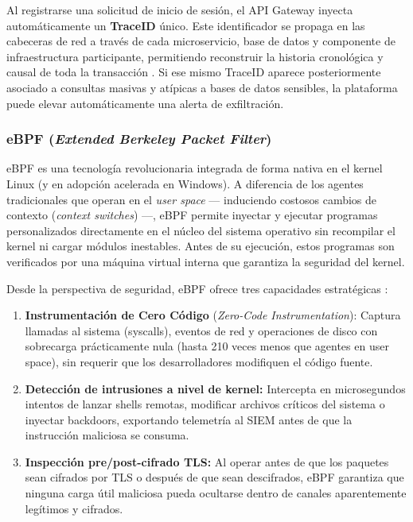 \documentclass[12pt, a4paper]{article}
\begin{document}
Al registrarse una solicitud de inicio de sesión, el API Gateway inyecta
automáticamente un \textbf{TraceID} único. Este identificador se propaga en las
cabeceras de red a través de cada microservicio, base de datos y componente de
infraestructura participante, permitiendo reconstruir la historia cronológica
y causal de toda la transacción \cite{opentelemetry,horovits2025}. Si ese mismo
TraceID aparece posteriormente asociado a consultas masivas y atípicas a bases
de datos sensibles, la plataforma puede elevar automáticamente una alerta de
exfiltración.

\subsubsection{eBPF (\textit{Extended Berkeley Packet Filter})}

eBPF \cite{linuxfoundation2025} es una tecnología revolucionaria integrada de
forma nativa en el kernel Linux (y en adopción acelerada en Windows). A diferencia
de los agentes tradicionales que operan en el \textit{user space} --- induciendo
costosos cambios de contexto (\textit{context switches}) ---, eBPF permite
inyectar y ejecutar programas personalizados directamente en el núcleo del
sistema operativo sin recompilar el kernel ni cargar módulos inestables. Antes
de su ejecución, estos programas son verificados por una máquina virtual interna
que garantiza la seguridad del kernel.

Desde la perspectiva de seguridad, eBPF ofrece tres capacidades estratégicas
\cite{researchgate2024,groundcover2025}:

\begin{enumerate}[noitemsep]
  \item \textbf{Instrumentación de Cero Código} (\textit{Zero-Code Instrumentation}):
        Captura llamadas al sistema (syscalls), eventos de red y operaciones de
        disco con sobrecarga prácticamente nula (hasta 210 veces menos que
        agentes en user space), sin requerir que los desarrolladores modifiquen
        el código fuente.
  \item \textbf{Detección de intrusiones a nivel de kernel:} Intercepta
        en microsegundos intentos de lanzar shells remotas, modificar archivos
        críticos del sistema o inyectar backdoors, exportando telemetría al SIEM
        antes de que la instrucción maliciosa se consuma.
  \item \textbf{Inspección pre/post-cifrado TLS:} Al operar antes de que los
        paquetes sean cifrados por TLS o después de que sean descifrados,
        eBPF garantiza que ninguna carga útil maliciosa pueda ocultarse dentro
        de canales aparentemente legítimos y cifrados.
\end{enumerate}
\end{document}
